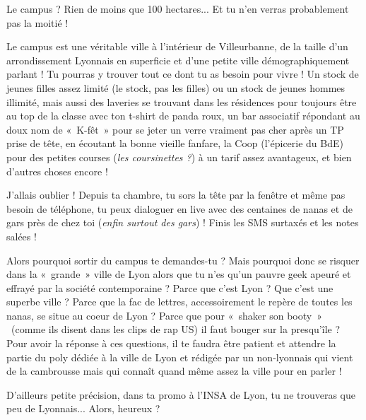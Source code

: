 Le campus ? Rien de moins que 100 hectares... Et tu n'en verras probablement pas
la moitié !

\vspace{1em}

Le campus est une véritable ville à l'intérieur de Villeurbanne, de la taille
d'un arrondissement Lyonnais en superficie et d'une petite ville
démographiquement parlant ! Tu pourras y trouver tout ce dont tu as besoin pour vivre !
Un stock de jeunes filles assez limité (le stock, pas les filles) ou un stock de jeunes hommes illimité, mais
aussi des laveries se trouvant dans les résidences pour toujours être au top de
la classe avec ton t-shirt de panda roux, un bar associatif répondant au doux nom de «~K-fêt~»
pour se jeter un verre vraiment pas cher après un TP prise de tête, en écoutant
la bonne vieille fanfare, la Coop (l'épicerie du BdE) pour des petites courses
(\emph{les coursinettes ?}) à un tarif assez avantageux, et bien d'autres choses encore !

\vspace{1em}

J'allais oublier ! Depuis ta chambre, tu sors la tête par la fenêtre et même pas
besoin de téléphone, tu peux dialoguer en live avec des centaines de nanas et
de gars près de chez toi (\emph{enfin surtout des gars}) ! Finis les SMS surtaxés et
les notes salées !

\vspace{1em}

Alors pourquoi sortir du campus te demandes-tu ? Mais pourquoi donc se risquer
dans la «~grande~» ville de Lyon alors que tu n'es qu'un pauvre geek apeuré et effrayé par la
société contemporaine ? Parce que c'est Lyon ? Que c'est une superbe ville ?
Parce que la fac de lettres, accessoirement le repère de toutes les nanas, se
situe au coeur de Lyon ? Parce que pour «~shaker son booty~» ~(comme ils disent dans
les clips de rap US) il faut bouger sur la presqu'île ? Pour avoir la réponse à
ces questions, il te faudra être patient et attendre la partie du poly dédiée à la ville
de Lyon et rédigée par un non-lyonnais qui vient de la cambrousse mais
qui connaît quand même assez la ville pour en parler !

\vspace{1em}

D'ailleurs petite précision, dans ta promo à l'INSA de Lyon, tu ne trouveras
que peu de Lyonnais... Alors, heureux ?
